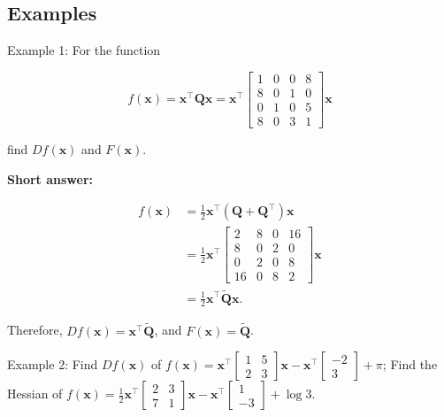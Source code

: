 \subsection{Examples}
Example 1: For the function

\begin{equation*}
	f(\boldsymbol{x})=\boldsymbol{x}^{\top} \boldsymbol{Q} \boldsymbol{x}=\boldsymbol{x}^{\top}\left[\begin{array}{cccc}
		1 & 0 & 0 & 8 \\
		8 & 0 & 1 & 0 \\
		0 & 1 & 0 & 5 \\
		8 & 0 & 3 & 1
	\end{array}\right] \boldsymbol{x}
\end{equation*}

find \(D f(\boldsymbol{x})\) and \(F(\boldsymbol{x})\).

\noindent
\textbf{Short answer:}

\begin{equation*}
	\begin{aligned}
		f(\boldsymbol{x}) & =\frac{1}{2} \boldsymbol{x}^{\top}\left(\boldsymbol{Q}+\boldsymbol{Q}^{\top}\right)\boldsymbol{x} \\
		& =\frac{1}{2} \boldsymbol{x}^{\top}\left[\begin{array}{cccc}
			2 & 8 & 0 & 16 \\
			8 & 0 & 2 & 0 \\
			0 & 2 & 0 & 8 \\
			16 & 0 & 8 & 2
		\end{array}\right] \boldsymbol{x} \\
		& = \frac{1}{2} \boldsymbol{x}^{\top} \tilde{\boldsymbol{Q}} \boldsymbol{x} .
	\end{aligned}
\end{equation*}

Therefore, \(D f(\boldsymbol{x})=\boldsymbol{x}^{\top} \tilde{\boldsymbol{Q}}\), and \(F(\boldsymbol{x})=\tilde{\boldsymbol{Q}}\).

\bigskip
\noindent
Example 2: Find \(D f(\boldsymbol{x})\) of \(f(\boldsymbol{x})=\boldsymbol{x}^{\top}\left[\begin{array}{ll}1 & 5 \\ 2 & 3\end{array}\right] \boldsymbol{x}-\boldsymbol{x}^{\top}\left[\begin{array}{c}-2 \\ 3\end{array}\right]+\pi\); Find the Hessian of \(f(\boldsymbol{x})=\frac{1}{2} \boldsymbol{x}^{\top}\left[\begin{array}{ll}2 & 3 \\ 7 & 1\end{array}\right] \boldsymbol{x}-\boldsymbol{x}^{\top}\left[\begin{array}{c}1 \\ -3\end{array}\right]+\log 3\).

